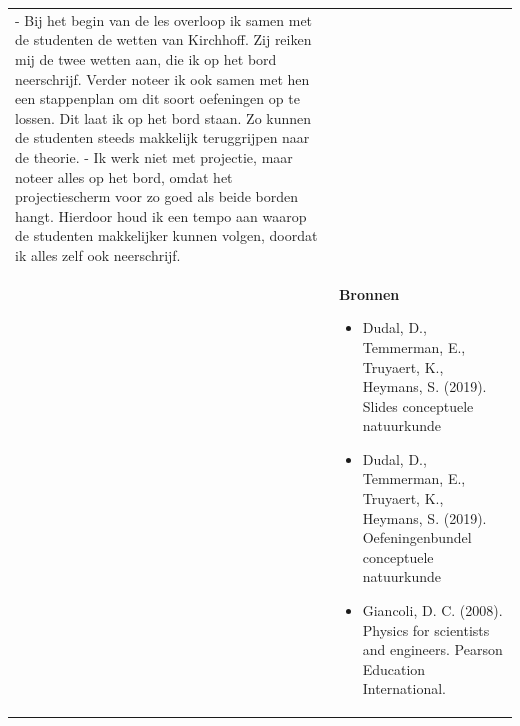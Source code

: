 \begin{landscape}
\begin{tabularx}{1.56\textwidth}{|p{}|X|}
		- Bij het begin van de les overloop ik samen met de studenten de wetten van Kirchhoff. Zij reiken mij de twee wetten aan, die ik op het bord neerschrijf. Verder noteer ik ook samen met hen een stappenplan om dit soort oefeningen op te lossen. Dit laat ik op het bord staan. Zo kunnen de studenten steeds makkelijk teruggrijpen naar de theorie. \newline\newline
		- Ik werk niet met projectie, maar noteer alles op het bord, omdat het projectiescherm voor zo goed als beide borden hangt. Hierdoor houd ik een tempo aan waarop de studenten makkelijker kunnen volgen, doordat ik alles zelf ook neerschrijf.  
		
		\\ \cline{2-2}
		  & \textbf{Bronnen}\begin{itemize}
		  	\item Dudal, D., Temmerman, E., Truyaert, K., Heymans, S. (2019). Slides conceptuele natuurkunde
		  	\item Dudal, D., Temmerman, E., Truyaert, K., Heymans, S. (2019). Oefeningenbundel conceptuele natuurkunde
		  	\item Giancoli, D. C. (2008). Physics for scientists and engineers. Pearson Education International.
		  \end{itemize}\\ \hline
	\end{tabularx}


\newpage


\end{landscape}

